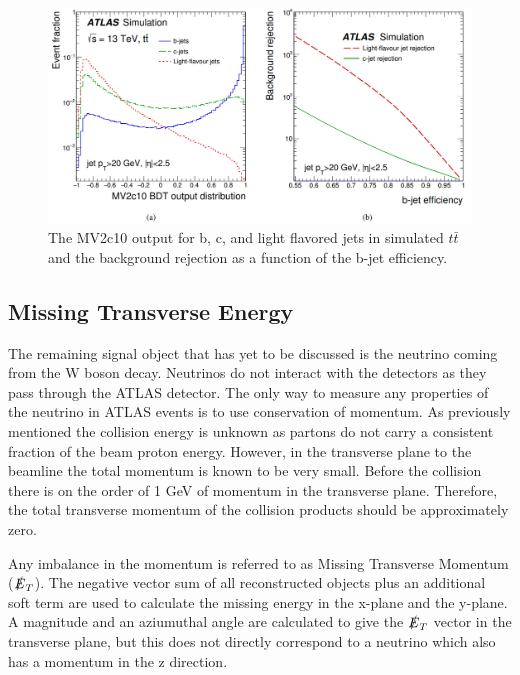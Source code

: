 \begin{figure}[h!]
	\centering
	\includegraphics[width=\columnwidth]{../ThesisImages/Simulation/BTagMV2c10andRejVsEff.png}
	\caption[The MV2c10 output for b, c, and light flavored jets in simulated $t\bar{t}$ and the background rejection as a function of the b-jet efficiency.]{The MV2c10 output for b, c, and light flavored jets in simulated $t\bar{t}$ and the background rejection as a function of the b-jet efficiency\cite{BJetMVA}.
	}
	\label{fig:BTag}
\end{figure}


\label{sec:bjetReco}

\subsection{Missing Transverse Energy}
The remaining signal object that has yet to be discussed is the neutrino coming from the W boson decay.  Neutrinos do not interact with the detectors as they pass through the ATLAS detector.  The only way to measure any properties of the neutrino in ATLAS events is to use conservation of momentum.  As previously mentioned the collision energy is unknown as partons do not carry a consistent fraction of the beam proton energy.  However, in the transverse plane to the beamline the total momentum is known to be very small.  Before the collision there is on the order of 1 GeV of momentum in the transverse plane.  Therefore, the total transverse momentum of the collision products should be approximately zero.

Any imbalance in the momentum is referred to as Missing Transverse Momentum ($\slashed{E}_T$).  The negative vector sum of all reconstructed objects plus an additional soft term are used to calculate the missing energy in the x-plane and the y-plane\cite{METreco}.  A magnitude and an aziumuthal angle are calculated to give the \textbf{$\slashed{E}_T$} vector in the transverse plane, but this does not directly correspond to a neutrino which also has a momentum in the z direction.

